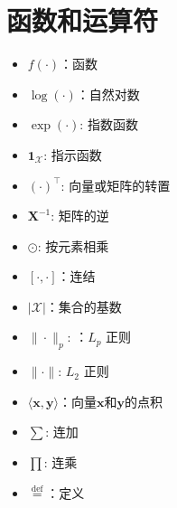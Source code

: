 \documentclass[letterpaper,10pt,english]{sphinxmanual}
\begin{document}
\section{函数和运算符}
\label{\detokenize{chapter_notation/index:id4}}\begin{itemize}
\item {} 
\sphinxAtStartPar
\(f(\cdot)\)：函数

\item {} 
\sphinxAtStartPar
\(\log(\cdot)\)：自然对数

\item {} 
\sphinxAtStartPar
\(\exp(\cdot)\): 指数函数

\item {} 
\sphinxAtStartPar
\(\mathbf{1}_\mathcal{X}\): 指示函数

\item {} 
\sphinxAtStartPar
\(\mathbf{(\cdot)}^\top\): 向量或矩阵的转置

\item {} 
\sphinxAtStartPar
\(\mathbf{X}^{-1}\): 矩阵的逆

\item {} 
\sphinxAtStartPar
\(\odot\): 按元素相乘

\item {} 
\sphinxAtStartPar
\([\cdot, \cdot]\)：连结

\item {} 
\sphinxAtStartPar
\(\lvert \mathcal{X} \rvert\)：集合的基数

\item {} 
\sphinxAtStartPar
\(\|\cdot\|_p\): ：\(L_p\) 正则

\item {} 
\sphinxAtStartPar
\(\|\cdot\|\): \(L_2\) 正则

\item {} 
\sphinxAtStartPar
\(\langle \mathbf{x}, \mathbf{y} \rangle\)：向量\(\mathbf{x}\)和\(\mathbf{y}\)的点积

\item {} 
\sphinxAtStartPar
\(\sum\): 连加

\item {} 
\sphinxAtStartPar
\(\prod\): 连乘

\item {} 
\sphinxAtStartPar
\(\stackrel{\mathrm{def}}{=}\)：定义

\end{itemize}
\end{document}
